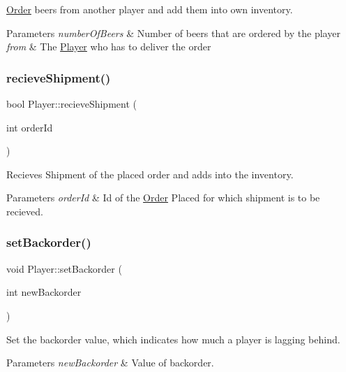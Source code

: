 \hyperlink{classOrder}{Order} beers from another player and add them into own inventory. 
\begin{DoxyParams}{Parameters}
{\em number\+Of\+Beers} & Number of beers that are ordered by the player \\
\hline
{\em from} & The \hyperlink{classPlayer}{Player} who has to deliver the order \\
\hline
\end{DoxyParams}
\mbox{\label{classPlayer_aba9c1a26d978924957526ec5652702a6}} 
\subsubsection{\texorpdfstring{recieve\+Shipment()}{recieveShipment()}}
{\footnotesize\ttfamily bool Player\+::recieve\+Shipment (\begin{DoxyParamCaption}\item[{int}]{order\+Id }\end{DoxyParamCaption})}

Recieves Shipment of the placed order and adds into the inventory. 
\begin{DoxyParams}{Parameters}
{\em order\+Id} & Id of the \hyperlink{classOrder}{Order} Placed for which shipment is to be recieved. \\
\hline
\end{DoxyParams}
\mbox{\label{classPlayer_a137d9597bcb0f47168cf1527cb07625a}} 
\subsubsection{\texorpdfstring{set\+Backorder()}{setBackorder()}}
{\footnotesize\ttfamily void Player\+::set\+Backorder (\begin{DoxyParamCaption}\item[{int}]{new\+Backorder }\end{DoxyParamCaption})}

Set the backorder value, which indicates how much a player is lagging behind. 
\begin{DoxyParams}{Parameters}
{\em new\+Backorder} & Value of backorder. \\
\hline
\end{DoxyParams}
\mbox{\label{classPlayer_adfe98f17f78bb7a89baee1c34ee09c75}} 
